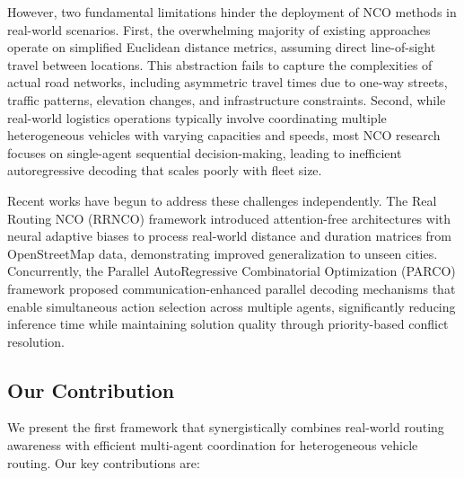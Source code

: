 \documentclass[lettersize,journal]{IEEEtran}
\begin{document}
However, two fundamental limitations hinder the deployment of NCO methods in real-world scenarios. First, the overwhelming majority of existing approaches operate on simplified Euclidean distance metrics, assuming direct line-of-sight travel between locations. This abstraction fails to capture the complexities of actual road networks, including asymmetric travel times due to one-way streets, traffic patterns, elevation changes, and infrastructure constraints. Second, while real-world logistics operations typically involve coordinating multiple heterogeneous vehicles with varying capacities and speeds, most NCO research focuses on single-agent sequential decision-making, leading to inefficient autoregressive decoding that scales poorly with fleet size.

Recent works have begun to address these challenges independently. The Real Routing NCO (RRNCO) framework \cite{son2026rrnco} introduced attention-free architectures with neural adaptive biases to process real-world distance and duration matrices from OpenStreetMap data, demonstrating improved generalization to unseen cities. Concurrently, the Parallel AutoRegressive Combinatorial Optimization (PARCO) framework \cite{berto2025parco} proposed communication-enhanced parallel decoding mechanisms that enable simultaneous action selection across multiple agents, significantly reducing inference time while maintaining solution quality through priority-based conflict resolution.

\subsection{Our Contribution}

We present the first framework that synergistically combines real-world routing awareness with efficient multi-agent coordination for heterogeneous vehicle routing. Our key contributions are:
\end{document}
